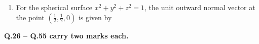 \documentclass[journal,11pt,onecolumn]{IEEEtran}
\begin{document}
\begin{enumerate}
    \item For the spherical surface \(x^2 + y^2 + z^2 = 1\), the unit outward normal vector at the point \(\left(\frac{1}{2}, \frac{1}{2}, 0\right)\) is given by

          \begin{enumerate}
          \end{enumerate}

\end{enumerate}

\newpage

\large\textbf{Q.26 -- Q.55 carry two marks each.}\\
\end{document}
